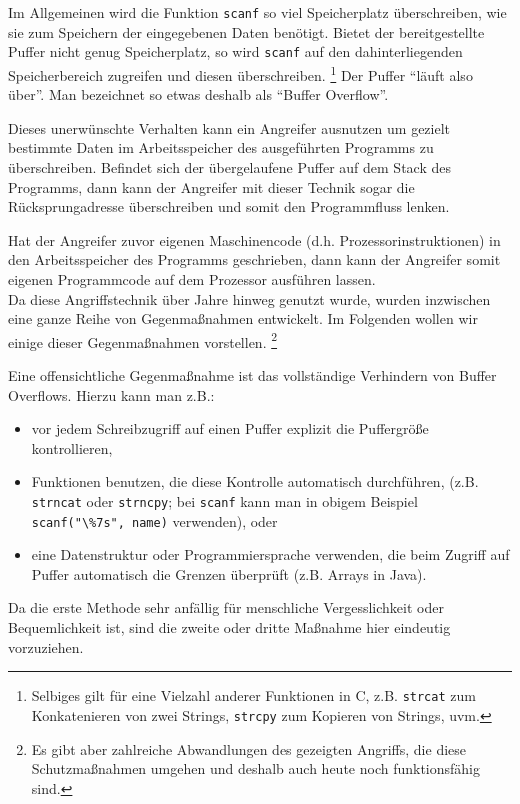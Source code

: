 Im Allgemeinen wird die Funktion \lstinline+scanf+ so viel Speicherplatz überschreiben,
wie sie zum Speichern der eingegebenen Daten benötigt.
Bietet der bereitgestellte Puffer nicht genug Speicherplatz,
so wird \lstinline+scanf+ auf den dahinterliegenden Speicherbereich zugreifen und diesen überschreiben.%
\footnote{Selbiges gilt für eine Vielzahl anderer Funktionen in C, z.B. \lstinline+strcat+ zum Konkatenieren von zwei Strings, \lstinline+strcpy+ zum Kopieren von Strings, uvm.}
Der Puffer "`läuft also über"'. Man bezeichnet so etwas deshalb als "`Buffer Overflow"'.

Dieses unerwünschte Verhalten kann ein Angreifer ausnutzen um gezielt bestimmte Daten im Arbeitsspeicher des ausgeführten Programms zu überschreiben.
Befindet sich der übergelaufene Puffer auf dem Stack des Programms,
dann kann der Angreifer mit dieser Technik sogar die Rücksprungadresse überschreiben und somit den Programmfluss lenken.

Hat der Angreifer zuvor eigenen Maschinencode (d.h. Prozessorinstruktionen) in den Arbeitsspeicher des Programms geschrieben,
dann kann der Angreifer somit eigenen Programmcode auf dem Prozessor ausführen lassen.\\

Da diese Angriffstechnik über Jahre hinweg genutzt wurde, wurden inzwischen eine ganze Reihe von Gegenmaßnahmen entwickelt. Im Folgenden wollen wir einige dieser Gegenmaßnahmen vorstellen.%
\footnote{Es gibt aber zahlreiche Abwandlungen des gezeigten Angriffs, die diese Schutzmaßnahmen umgehen und deshalb auch heute noch funktionsfähig sind.}

Eine offensichtliche Gegenmaßnahme ist das vollständige Verhindern von Buffer Overflows.
Hierzu kann man z.B.:
\begin{itemize}
	\item vor jedem Schreibzugriff auf einen Puffer explizit die Puffergröße kontrollieren,
	\item Funktionen benutzen, die diese Kontrolle automatisch durchführen, (z.B. \lstinline+strncat+ oder \lstinline+strncpy+; bei \lstinline+scanf+ kann man in obigem Beispiel \lstinline+scanf("\%7s", name)+ verwenden), oder
	\item eine Datenstruktur oder Programmiersprache verwenden, die beim Zugriff auf Puffer automatisch die Grenzen überprüft (z.B. Arrays in Java).
\end{itemize}

Da die erste Methode sehr anfällig für menschliche Vergesslichkeit oder Bequemlichkeit ist, sind die zweite oder dritte Maßnahme hier eindeutig vorzuziehen.\

